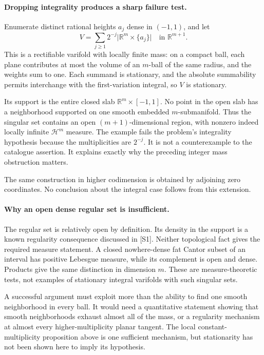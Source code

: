 \documentclass[11pt]{article}
\begin{document}
\paragraph{Dropping integrality produces a sharp failure test.}
Enumerate distinct rational heights $a_j$ dense in $(-1,1)$,
and let
\[
 V=\sum_{j\geq1}2^{-j}
             \bigl|\mathbb R^m\times\{a_j\}\bigr|
 \quad\text{in }\mathbb R^{m+1}.
\]
This is a rectifiable varifold with locally finite mass:
on a compact ball, each plane contributes at most the
volume of an $m$-ball of the same radius, and the
weights sum to one. Each summand is stationary, and
the absolute summability permits interchange with
the first-variation integral, so $V$ is stationary.

Its support is the entire closed slab
$\mathbb R^m\times[-1,1]$. No point in the open slab
has a neighborhood supported on one smooth embedded
$m$-submanifold. Thus the singular set contains an
open $(m+1)$-dimensional region, with nonzero
indeed locally infinite $\mathcal H^m$ measure.
The example fails the problem's integrality
hypothesis because the multiplicities are
$2^{-j}$. It is not a counterexample to the
catalogue assertion. It explains exactly why
the preceding integer mass obstruction matters.

The same construction in higher codimension is
obtained by adjoining zero coordinates. No
conclusion about the integral case follows from
this extension.

\paragraph{Why an open dense regular set is insufficient.}
The regular set is relatively open by definition.
Its density in the support is a known regularity
consequence discussed in [S1]. Neither topological
fact gives the required measure statement.
A closed nowhere-dense fat Cantor subset of an
interval has positive Lebesgue measure, while its
complement is open and dense. Products give the
same distinction in dimension $m$. These are
measure-theoretic tests, not examples of stationary
integral varifolds with such singular sets.

A successful argument must exploit more than
the ability to find one smooth neighborhood in
every ball. It would need a quantitative statement
showing that smooth neighborhoods exhaust almost
all of the mass, or a regularity mechanism at
almost every higher-multiplicity planar tangent.
The local constant-multiplicity proposition above
is one sufficient mechanism, but stationarity
has not been shown here to imply its hypothesis.
\end{document}
